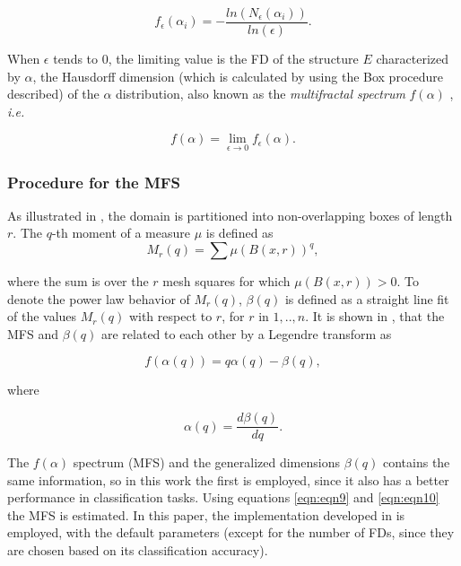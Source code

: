 \begin{equation}
f_{\epsilon}(\alpha_{i}) = - \frac{ln(N_{\epsilon}(\alpha_{i}))}{ln(\epsilon)}.
\label{eqn:eqn6}
\end{equation}

When $\epsilon$ tends to $0$, the limiting value is the FD of the structure $E$ characterized by $\alpha$, the Hausdorff dimension (which is calculated by using the Box procedure described) of the $\alpha$ distribution, also known as the {\em multifractal spectrum} $f(\alpha)$ \cite{Silvetti2010}, {\em i.e.}

\begin{equation}
f(\alpha) = \lim_{\epsilon\to0}{f_{\epsilon}(\alpha)}.
\label{eqn:eqn7}
\end{equation}

\subsubsection{Procedure for the MFS}
As illustrated in \cite{Xu2006}, the domain is partitioned into non-overlapping boxes of length $r$. The $q$-th moment of a measure $\mu$ is defined as
\begin{equation}
M_{r}(q) = \sum{\mu(B(x,r))^{q}},
\label{eqn:eqn8}
\end{equation}

where the sum is over the $r$ mesh squares for which $\mu(B(x,r)) > 0$. To denote the power law behavior of $M_{r}(q)$, $\beta(q)$ is defined as a straight line fit of the values $M_{r}(q)$ with respect to $r$, for $r$ in $1,..,n$. It is shown in \cite{Falconer97}, that the MFS and $\beta(q)$ are related to each other by a Legendre transform as

\begin{equation}
f(\alpha(q)) = q \alpha(q) - \beta(q),
\label{eqn:eqn9}
\end{equation}

where

\begin{equation}
\alpha(q) = \frac{d\beta(q)}{dq}.
\label{eqn:eqn10}
\end{equation}

The $f(\alpha)$ spectrum (MFS) and the generalized dimensions $\beta(q)$ contains the same information, so in this work the first is employed, since it also has a better performance in classification tasks. Using equations \ref{eqn:eqn9} and \ref{eqn:eqn10} the MFS is estimated. In this paper, the implementation developed in \cite{Xu2006} is employed, with the default parameters (except for the number of FDs, since they are chosen based on its classification accuracy).


